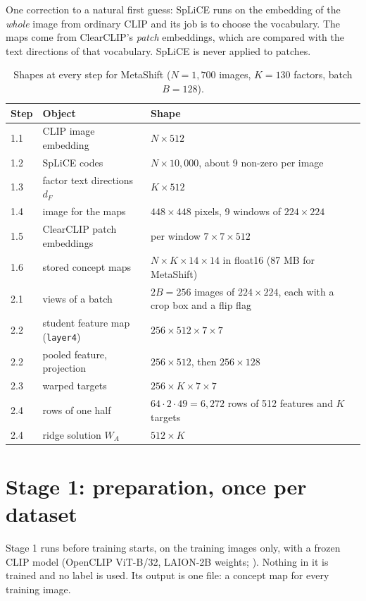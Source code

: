 \documentclass[11pt]{article}
\begin{document}
One correction to a natural first guess: SpLiCE runs on the embedding of the \emph{whole} image from ordinary
CLIP and its job is to choose the vocabulary. The maps come from ClearCLIP's \emph{patch} embeddings, which are
compared with the text directions of that vocabulary. SpLiCE is never applied to patches.

\begin{table}[H]
\centering
\caption{Shapes at every step for MetaShift ($N=1{,}700$ images, $K=130$ factors, batch $B=128$).}
\label{tab:shapes}
\small
\begin{tabularx}{\linewidth}{l l X}
\toprule
Step & Object & Shape \\
\midrule
1.1 & CLIP image embedding & $N\times512$ \\
1.2 & SpLiCE codes & $N\times10{,}000$, about 9 non-zero per image \\
1.3 & factor text directions $d_F$ & $K\times512$ \\
1.4 & image for the maps & $448\times448$ pixels, 9 windows of $224\times224$ \\
1.5 & ClearCLIP patch embeddings & per window $7\times7\times512$ \\
1.6 & stored concept maps & $N\times K\times14\times14$ in float16 (87 MB for MetaShift) \\
2.1 & views of a batch & $2B=256$ images of $224\times224$, each with a crop box and a flip flag \\
2.2 & student feature map (\texttt{layer4}) & $256\times512\times7\times7$ \\
2.2 & pooled feature, projection & $256\times512$, then $256\times128$ \\
2.3 & warped targets & $256\times K\times7\times7$ \\
2.4 & rows of one half & $64\cdot2\cdot49=6{,}272$ rows of 512 features and $K$ targets \\
2.4 & ridge solution $W_A$ & $512\times K$ \\
\bottomrule
\end{tabularx}
\end{table}

\section{Stage 1: preparation, once per dataset}
Stage 1 runs before training starts, on the training images only, with a frozen CLIP model (OpenCLIP ViT-B/32,
LAION-2B weights; \citealp{radford2021clip}). Nothing in it is trained and no label is used. Its output is one
file: a concept map for every training image.
\end{document}
